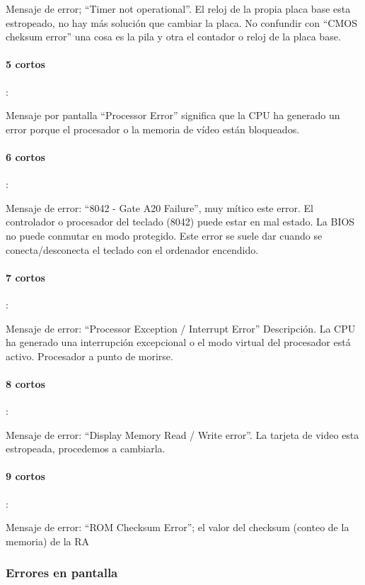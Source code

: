 \documentclass[12pt,oneside,a4paper]{article}
\begin{document}
			Mensaje de error; “Timer not operational”. El reloj de la propia placa
			base esta estropeado, no hay más solución que cambiar la placa. No
			confundir con “CMOS cheksum error” una cosa es la pila y otra el
			contador o reloj de la placa base. 

			\paragraph{5 cortos}:
			
			Mensaje por pantalla ``Processor Error'' significa que la CPU ha generado
			un error porque el procesador o la memoria de vídeo están bloqueados. 

			\paragraph{6 cortos}:

			Mensaje de error: ``8042 - Gate A20 Failure'', muy mítico este error.
			El controlador o procesador del teclado (8042) puede estar en mal
			estado. 
			La BIOS no puede conmutar en modo protegido. Este error se
			suele dar cuando se conecta/desconecta el teclado con el ordenador
			encendido. 

			\paragraph{7 cortos}:
			
			Mensaje de error: “Processor Exception / Interrupt Error” Descripción. La CPU ha generado una interrupción excepcional o el modo virtual del procesador está activo. Procesador a punto de morirse. 

			\paragraph{8 cortos}:
			
			Mensaje de error: ``Display Memory Read / Write error''. La tarjeta de video esta estropeada, procedemos a cambiarla. 

			\paragraph{9 cortos}:
			
			Mensaje de error: ``ROM Checksum Error''; el valor del checksum (conteo de la memoria) de la RA

		\newpage

		\subsubsection{Errores en pantalla}\label{sub:errores en pantalla}
		
\end{document}
